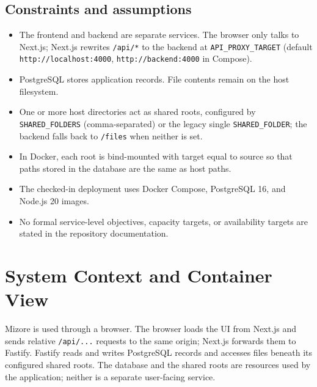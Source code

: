 \documentclass[10pt]{article}
\begin{document}
\subsection{Constraints and assumptions}
\begin{itemize}
  \item The frontend and backend are separate services. The browser only talks to Next.js;
  Next.js rewrites \texttt{/api/*} to the backend at \texttt{API\_PROXY\_TARGET}
  (default \texttt{http://localhost:4000}, \texttt{http://backend:4000} in Compose).
  \item PostgreSQL stores application records. File contents remain on the host filesystem.
  \item One or more host directories act as shared roots, configured by
  \texttt{SHARED\_FOLDERS} (comma-separated) or the legacy single \texttt{SHARED\_FOLDER};
  the backend falls back to \texttt{/files} when neither is set.
  \item In Docker, each root is bind-mounted with target equal to source so that paths stored in
  the database are the same as host paths.
  \item The checked-in deployment uses Docker Compose, PostgreSQL 16, and Node.js 20 images.
  \item No formal service-level objectives, capacity targets, or availability targets are stated
  in the repository documentation.
\end{itemize}

\section{System Context and Container View}

Mizore is used through a browser. The browser loads the UI from Next.js and sends relative
\texttt{/api/...} requests to the same origin; Next.js forwards them to Fastify. Fastify reads and
writes PostgreSQL records and accesses files beneath its configured shared roots. The database
and the shared roots are resources used by the application; neither is a separate user-facing
service.
\end{document}

